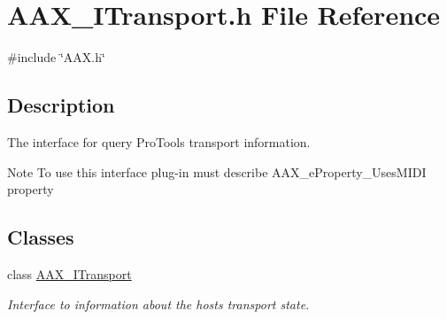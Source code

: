 \hypertarget{a00641}{}\section{A\+A\+X\+\_\+\+I\+Transport.\+h File Reference}
\label{a00641}
{\ttfamily \#include \char`\"{}A\+A\+X.\+h\char`\"{}}\newline


\subsection{Description}
The interface for query Pro\+Tools transport information. 

\begin{DoxyNote}{Note}
To use this interface plug-\/in must describe A\+A\+X\+\_\+e\+Property\+\_\+\+Uses\+M\+I\+DI property 
\end{DoxyNote}
\subsection*{Classes}
\begin{DoxyCompactItemize}
\item 
class \mbox{\hyperlink{a01885}{A\+A\+X\+\_\+\+I\+Transport}}
\begin{DoxyCompactList}\small\item\em Interface to information about the host\textquotesingle{}s transport state. \end{DoxyCompactList}\end{DoxyCompactItemize}
